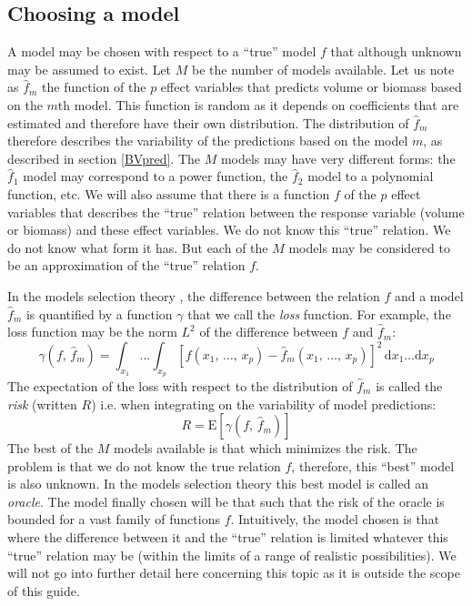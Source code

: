 \subsection{Choosing a model}

A model may be chosen with respect to a ``true''
model $f$ that although unknown may be assumed to exist. Let $M$ be the number of models available. Let us note as 
$\hat{f}_m$ the function of the $p$ effect variables that predicts volume or biomass based on the $m$th model. This function is random as it depends on coefficients that are estimated and therefore have their own distribution. The distribution of 
$\hat{f}_m$ therefore describes the variability of the predictions based on the model $m$, as described in section 
\ref{BVpred}. The $M$ models may have very different forms: the $\hat{f}_1$ model may correspond to a power function, the $\hat{f}_2$ model to a polynomial function, etc. We will also assume that there is a function $f$ of the $p$ effect variables that describes the
``true'' relation between the response variable (volume or biomass) and these effect variables. We do not know this 
``true'' relation. We do not know what form it has. But each of the $M$ models may be considered to be an approximation of the ``true'' relation $f$.

In the models selection theory \citep{massart07},
the difference between the relation $f$ and a model $\hat{f}_m$ is quantified by a function $\gamma$ that we call the \emph{loss} function. For example, the loss function may be the norm $L^2$ of the difference between $f$ and $\hat{f}_m$:
\[
\gamma(f,\,\hat{f}_m)=\int_{x_1}\ldots\int_{x_p}
[f(x_1,\,\ldots,\,x_p)-\hat{f}_m(x_1,\,\ldots,\,x_p)]^2
\,\mathrm{d}x_1\ldots\mathrm{d}x_p
\]
The expectation of the loss with respect to the distribution of $\hat{f}_m$ is called the \emph{risk} (written $R$) i.e. when integrating on the variability of model predictions:
\[
R=\mathrm{E}[\gamma(f,\,\hat{f}_m)]
\]
The best of the $M$ models available is that which minimizes the risk. The problem is that we do not know the true relation $f$, therefore, this ``best'' model is also unknown. In the models selection theory this best model is called an \emph{oracle}. The model finally chosen will be that such that the risk of the oracle is bounded for a vast family of functions $f$. Intuitively, the model chosen is that where the difference between it and the ``true'' relation is limited whatever this ``true'' relation may be (within the limits of a range of realistic possibilities). We will not go into further detail here concerning this topic as it is outside the scope of this guide.

